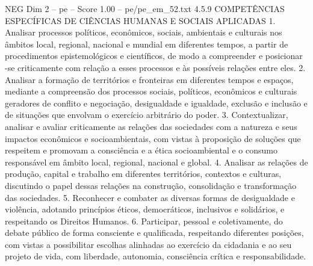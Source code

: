 \begin{textsample}{NEG Dim 2 – pe – Score 1.00 – pe/pe\_em\_52.txt}  \label{ex:f2_neg_040}
4.5.9 COMPETÊNCIAS ESPECÍFICAS DE CIÊNCIAS HUMANAS E SOCIAIS APLICADAS 1.
Analisar processos políticos, econômicos, sociais, ambientais e culturais nos âmbitos local, regional, nacional e mundial em diferentes tempos, a partir de procedimentos epistemológicos e científicos, de modo a compreender e posicionar -se criticamente com relação a esses processos e às possíveis relações entre eles. 2.
Analisar a formação de territórios e fronteiras em diferentes tempos e espaços, mediante a compreensão dos processos sociais, políticos, econômicos e culturais geradores de conflito e negociação, desigualdade e igualdade, exclusão e inclusão e de situações que envolvam o exercício arbitrário do poder. 3.
Contextualizar, analisar e avaliar criticamente as relações das sociedades com a natureza e seus impactos econômicos e socioambientais, com vistas à proposição de soluções que respeitem e promovam a consciência e a ética socioambiental e o consumo responsável em âmbito local, regional, nacional e global. 4.
Analisar as relações de produção, capital e trabalho em diferentes territórios, contextos e culturas, discutindo o papel dessas relações na construção, consolidação e transformação das sociedades. 5.
Reconhecer e combater as diversas formas de desigualdade e violência, adotando princípios éticos, democráticos, inclusivos e solidários, e respeitando os Direitos Humanos. 6.
Participar, pessoal e coletivamente, do debate público de forma consciente e qualificada, respeitando diferentes posições, com vistas a possibilitar escolhas alinhadas ao exercício da cidadania e ao seu projeto de vida, com liberdade, autonomia, consciência crítica e responsabilidade.

\end{textsample}
